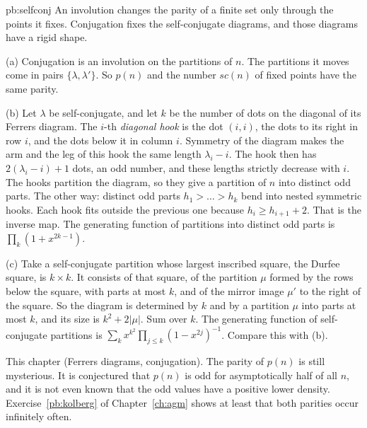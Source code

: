 \begin{solution}{pb:selfconj}
\idea An involution changes the parity of a finite set only through the points it fixes. Conjugation fixes the self-conjugate diagrams, and those diagrams have a rigid shape.

\writeup (a) Conjugation is an involution on the partitions of $n$. The partitions it moves come in pairs
$\{\lambda,\lambda'\}$. So $p(n)$ and the number $sc(n)$ of fixed points have the same parity.

(b) Let $\lambda$ be self-conjugate, and let $k$ be the number of dots on the diagonal of its Ferrers diagram. The $i$-th
\emph{diagonal hook} is the dot $(i,i)$, the dots to its right in row $i$, and the dots below it in column $i$. Symmetry of the
diagram makes the arm and the leg of this hook the same length $\lambda_i-i$. The hook then has $2(\lambda_i-i)+1$ dots, an
odd number, and these lengths strictly decrease with $i$. The hooks partition the diagram, so they give a partition of $n$ into
distinct odd parts. The other way: distinct odd parts $h_1>\dots>h_k$ bend into nested symmetric hooks. Each hook fits outside
the previous one because $h_i\ge h_{i+1}+2$. That is the inverse map. The generating function of partitions into distinct odd
parts is $\prod_k(1+x^{2k-1})$.

(c) Take a self-conjugate partition whose largest inscribed square, the Durfee square, is $k\times k$. It consists of that square,
of the partition $\mu$ formed by the rows below the square, with parts at most $k$, and of the mirror image $\mu'$ to the
right of the square. So the diagram is determined by $k$ and by a partition $\mu$ into parts at most $k$, and its size is $k^2+2|\mu|$. Sum over $k$.
The generating function of self-conjugate partitions is $\sum_kx^{k^2}\prod_{j\le k}(1-x^{2j})^{-1}$. Compare this with (b).

\tools This chapter (Ferrers diagrams, conjugation).
\leads The parity of $p(n)$ is still mysterious. It is conjectured that $p(n)$ is odd for asymptotically half of all $n$, and it is
not even known that the odd values have a positive lower density. Exercise~\ref{pb:kolberg} of Chapter~\ref{ch:agm} shows at least that both parities occur
infinitely often.
\end{solution}

